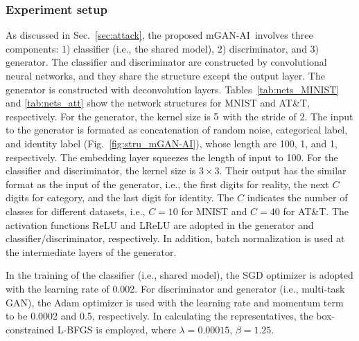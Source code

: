 \documentclass[10pt, conference, letterpaper]{IEEEtran}
\newcommand{\alg}{mGAN-AI}
\newcommand{\zz}[1]{\textcolor{red}{[Zhifei: #1]}}
\begin{document}
\subsubsection{Experiment setup}
As discussed in Sec.~\ref{sec:attack}, the proposed \alg~involves three components: 1) classifier (i.e., the shared model), 2) discriminator, and 3) generator. The classifier and discriminator are constructed by convolutional neural networks, and they share the structure except the output layer. The generator is constructed with deconvolution layers.
Tables~\ref{tab:nets_MINIST} and \ref{tab:nets_att} show the network structures for MNIST and AT\&T, respectively.
For the generator, the kernel size is $5\time 5$ with the stride of 2. The input to the generator is formated as concatenation of random noise, categorical label, and identity label (Fig.~\ref{fig:stru_mGAN-AI}), whose length are 100, 1, and 1, respectively. The embedding layer squeezes the length of input to 100.
For the classifier and discriminator, the kernel size is $3\times 3$. Their output has the similar format as the input of the generator, i.e., the first digits for reality, the next $C$ digits for category, and the last digit for identity. The $C$ indicates the number of classes for different datasets, i.e., $C=10$ for MNIST and $C=40$ for AT\&T.
The activation functions ReLU and LReLU are adopted in the generator and classifier/discriminator, respectively.
In addition, batch normalization is used at the intermediate layers of the generator.

In the training of the classifier (i.e., shared model), the SGD optimizer is adopted with the learning rate of 0.002. For discriminator and generator (i.e., multi-task GAN), the Adam optimizer is used with the learning rate and momentum term to be 0.0002 and 0.5, respectively. In calculating the representatives, the box-constrained L-BFGS is employed, where $\lambda = 0.00015$, $\beta=1.25$. %
\end{document}
